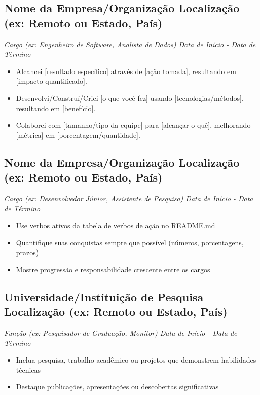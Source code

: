 \documentclass[a4paper,10pt]{article}
\begin{document}
    \subsection*{\texorpdfstring{
            \textbf{Nome da Empresa/Organização} \hfill Localização (ex: Remoto ou Estado, País)
        }{
            Nome da Empresa -- Localização
        }}
    \textit{Cargo (ex: Engenheiro de Software, Analista de Dados) \hfill Data de Início - Data de Término}
        \begin{itemize} 
            \item Alcancei [resultado específico] através de [ação tomada], resultando em [impacto quantificado].
            \item Desenvolvi/Construí/Criei [o que você fez] usando [tecnologias/métodos], resultando em [benefício].
            \item Colaborei com [tamanho/tipo da equipe] para [alcançar o quê], melhorando [métrica] em [porcentagem/quantidade].
        \end{itemize}

    \subsection*{\texorpdfstring{
        	\textbf{Nome da Empresa/Organização} \hfill Localização (ex: Remoto ou Estado, País)
        }{
            Nome da Empresa -- Localização
        }}
    \textit{Cargo (ex: Desenvolvedor Júnior, Assistente de Pesquisa) \hfill Data de Início - Data de Término}
        \begin{itemize}
            \item Use verbos ativos da tabela de verbos de ação no README.md
            \item Quantifique suas conquistas sempre que possível (números, porcentagens, prazos)
            \item Mostre progressão e responsabilidade crescente entre os cargos
        \end{itemize}
        
    \subsection*{\texorpdfstring{
        	\textbf{Universidade/Instituição de Pesquisa} \hfill Localização (ex: Remoto ou Estado, País)
        }{
            Universidade/Instituição de Pesquisa -- Localização
        }}
    \textit{Função (ex: Pesquisador de Graduação, Monitor) \hfill Data de Início - Data de Término}
        \begin{itemize}
            \item Inclua pesquisa, trabalho acadêmico ou projetos que demonstrem habilidades técnicas
            \item Destaque publicações, apresentações ou descobertas significativas
        \end{itemize}
\end{document}
